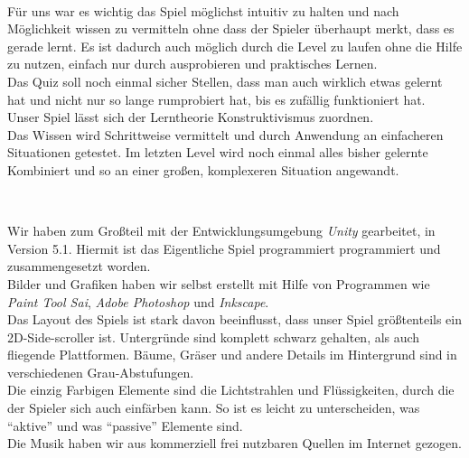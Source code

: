 \documentclass[10pt,a4paper,notitlepage]{report}
\begin{document}
	\\\par\medskip\Text
	Für uns war es wichtig das Spiel möglichst intuitiv zu halten und nach Möglichkeit wissen zu vermitteln ohne dass der Spieler überhaupt merkt, dass es gerade lernt. Es ist dadurch auch möglich durch die Level zu laufen ohne die Hilfe zu nutzen, einfach nur durch ausprobieren und praktisches Lernen.\\
	Das Quiz soll noch einmal sicher Stellen, dass man auch wirklich etwas gelernt hat und nicht nur so lange rumprobiert hat, bis es zufällig funktioniert hat.\\
	Unser Spiel lässt sich der Lerntheorie Konstruktivismus zuordnen.\\
	Das Wissen wird Schrittweise vermittelt und durch Anwendung an einfacheren Situationen getestet. Im letzten Level wird noch einmal alles bisher gelernte Kombiniert und so an einer großen, komplexeren Situation angewandt.\\\par\smallskip
	
	\\\par\medskip\Text
	Wir haben zum Großteil mit der Entwicklungsumgebung \textit{Unity} gearbeitet, in Version 5.1. Hiermit ist das Eigentliche Spiel programmiert programmiert und zusammengesetzt worden.\\
	Bilder und Grafiken haben wir selbst erstellt mit Hilfe von Programmen wie \textit{Paint Tool Sai}, \textit{Adobe Photoshop} und \textit{Inkscape}.\\
	Das Layout des Spiels ist stark davon beeinflusst, dass unser Spiel größtenteils ein 2D-Side-scroller ist. Untergründe sind komplett schwarz gehalten, als auch fliegende Plattformen. Bäume, Gräser und andere Details im Hintergrund sind in verschiedenen Grau-Abstufungen.\\
	Die einzig Farbigen Elemente sind die Lichtstrahlen und Flüssigkeiten, durch die der Spieler sich auch einfärben kann. So ist es leicht zu unterscheiden, was \enquote{aktive} und was \enquote{passive} Elemente sind.\\
	Die Musik haben wir aus kommerziell frei nutzbaren Quellen im Internet gezogen.\\\par\smallskip
	
	\clearpage
	\marginpar{\vspace{3.0mm} \color{orange}\rule{0.8mm}{53.3mm} \\[3mm] \color{hellorange}\rule{0.8mm}{170mm}}
	\par\bigskip
\end{document}
